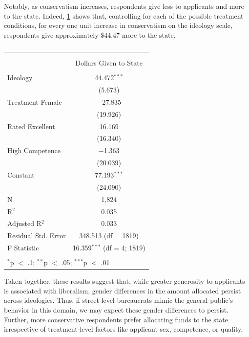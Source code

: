 \documentclass[12pt]{article}%
\begin{document}
\begin{doublespace}
Notably, as conservatism increases, respondents give less to applicants and more to the state. Indeed, \ref{table} shows that, controlling for each of the possible treatment conditions, for every one unit increase in conservatism on the ideology scale, respondents give approximately $\$44.47$ more to the state.

\begin{table}[!htbp] \centering 
	\caption{} 
	\label{table}
	\begin{tabular}{@{\extracolsep{5pt}}lc} 
		\\[-1.8ex]\hline \\[-1.8ex] 
		\\[-1.8ex] & Dollars Given to State \\ 
		\hline \\[-1.8ex] 
		Ideology & 44.472$^{***}$ \\ 
		& (5.673) \\ 
		Treatment Female & $-$27.835 \\ 
		& (19.926) \\ 
		Rated Excellent & 16.169 \\ 
		& (16.340) \\ 
		High Competence & $-$1.363 \\ 
		& (20.039) \\ 
		Constant & 77.193$^{***}$ \\ 
		& (24.090) \\ 
		N & 1,824 \\ 
		R$^{2}$ & 0.035 \\ 
		Adjusted R$^{2}$ & 0.033 \\ 
		Residual Std. Error & 348.513 (df = 1819) \\ 
		F Statistic & 16.359$^{***}$ (df = 4; 1819) \\ 
		\hline \\[-1.8ex] 
		\multicolumn{2}{l}{$^{*}$p $<$ .1; $^{**}$p $<$ .05; $^{***}$p $<$ .01} \\ 
	\end{tabular} 
\end{table} 

Taken together, these results suggest that, while greater generosity to applicants is associated with liberalism, gender differences in the amount allocated persist across ideologies. Thus, if street level bureaucrats mimic the general public’s behavior in this domain, we may expect these gender differences to persist. Further, more conservative respondents prefer allocating funds to the state irrespective of treatment-level factors like applicant sex, competence, or quality.


\end{doublespace}
\end{document}
